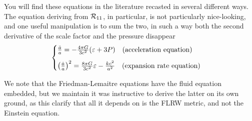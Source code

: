 You will find these equations in the literature recasted in several different
ways. The equation deriving from $\mathcal{R}_{11}$, in particular, is not particularly
nice-looking, and one useful manipulation is to sum the two, in such a way both the
second derivative of the scale factor and the pressure disappear
\begin{align}\label{eq:friedman}
  \begin{cases}
    \frac{\ddot{a}}{a} = -\frac{4\pi G}{3c^2}(\varepsilon + 3P)
    \quad\text{(acceleration equation)} \\[8pt]
    \left(\frac{\dot{a}}{a}\right)^2 = \frac{8\pi G}{3c^2}\varepsilon - \frac{k c^2}{a^2}
    \quad\text{(expansion rate equation)}
  \end{cases}
\end{align}

We note that the Friedman-Lemaitre equations have the fluid equation embedded, but
we maintain it was instructive to derive the latter on its own ground, as this
clarify that all it depends on is the FLRW metric, and not the Einstein equation.

